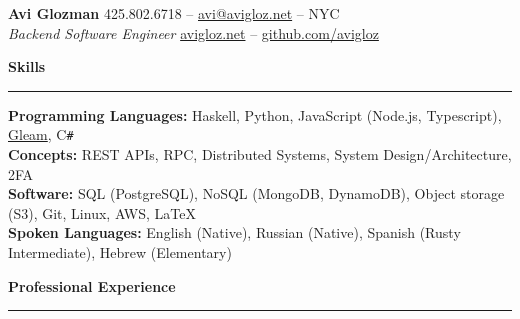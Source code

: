 \documentclass[10pt]{article}
\begin{document}
	\pagestyle{empty}
	\begin{center}
		{\huge \textbf{Avi Glozman}} {\large \hfill 425.802.6718 -- \href{mailto:avi@avigloz.net}{avi@avigloz.net} -- NYC} \\
		{\large \textsl{Backend Software Engineer} \hfill \href{https://avigloz.net}{avigloz.net} -- \href{https://github.com/avigloz}{github.com/avigloz}}
	\end{center}
	
	\begin{flushleft}	
		\vspace{-0.5mm}
		{\large \raggedright \textbf{Skills}}
		\vspace{1.25mm}
	
		\hrule
	
		\vspace{2.25mm}
		\textbf{Programming Languages:} Haskell, Python, JavaScript (Node.js, Typescript), \href{https://gleam.run/}{Gleam}, C\verb!#!\\
		\vspace{0.5mm}
		\textbf{Concepts:} REST APIs, RPC, Distributed Systems, System Design/Architecture, 2FA\\
		\vspace{0.5mm}
		\textbf{Software:} SQL (PostgreSQL), NoSQL (MongoDB, DynamoDB), Object storage (S3), Git, Linux, AWS, \LaTeX\\ 
		\vspace{0.5mm}
		\textbf{Spoken Languages:} English (Native), Russian (Native), Spanish (Rusty Intermediate), Hebrew (Elementary)

		\vspace{1.5mm}
		{\large \raggedright \textbf{Professional Experience}}
		\vspace{1.25mm}
	
		\hrule

		\vspace{2.25mm}


\end{flushleft}
\end{document}

